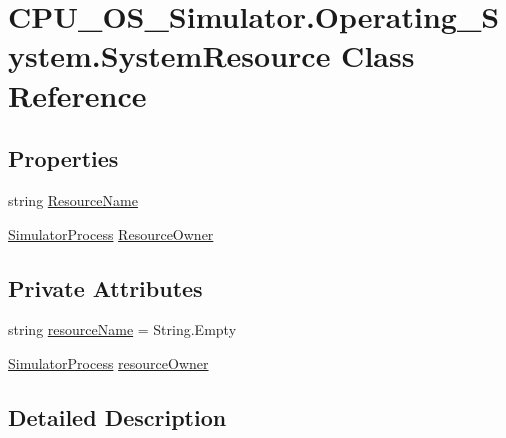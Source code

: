 \hypertarget{class_c_p_u___o_s___simulator_1_1_operating___system_1_1_system_resource}{}\section{C\+P\+U\+\_\+\+O\+S\+\_\+\+Simulator.\+Operating\+\_\+\+System.\+System\+Resource Class Reference}
\label{class_c_p_u___o_s___simulator_1_1_operating___system_1_1_system_resource}
\subsection*{Properties}
\begin{DoxyCompactItemize}
\item 
string \hyperlink{class_c_p_u___o_s___simulator_1_1_operating___system_1_1_system_resource_a8960fd4248d2a386e02166ab5deb107f}{Resource\+Name}
\item 
\hyperlink{class_c_p_u___o_s___simulator_1_1_operating___system_1_1_simulator_process}{Simulator\+Process} \hyperlink{class_c_p_u___o_s___simulator_1_1_operating___system_1_1_system_resource_aeb8029700d1acf805ec2be0a5d4acb41}{Resource\+Owner}
\end{DoxyCompactItemize}
\subsection*{Private Attributes}
\begin{DoxyCompactItemize}
\item 
string \hyperlink{class_c_p_u___o_s___simulator_1_1_operating___system_1_1_system_resource_a2583b450f5ea341fbae70e7ffebd240c}{resource\+Name} = String.\+Empty
\item 
\hyperlink{class_c_p_u___o_s___simulator_1_1_operating___system_1_1_simulator_process}{Simulator\+Process} \hyperlink{class_c_p_u___o_s___simulator_1_1_operating___system_1_1_system_resource_a970294d8115e61387b93ef4cc70a7de1}{resource\+Owner}
\end{DoxyCompactItemize}


\subsection{Detailed Description}


